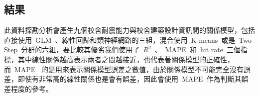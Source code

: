 
\subsection{結果}

此資料探勘分析會產生九個校舍耐震能力與校舍建築設計資訊間的關係模型，包括直接使用~GLM~、線性回歸和類神經網路的三組，混合使用~K-means~或是~Two-Step~分群的六組，要比較其優劣我們使用了~$R^2$~、~MAPE~和~hit rate~三個指標，其中線性關係越高表示兩者之間越接近，也代表著關係模型的正確性，而~MAPE~ 的是用來表示關係模型誤差之數值，由於關係模型不可能完全沒有誤差，即使有非常高的線性關係也是會有誤差，因此會使用~MAPE~作為判斷其誤差程度的參考。





